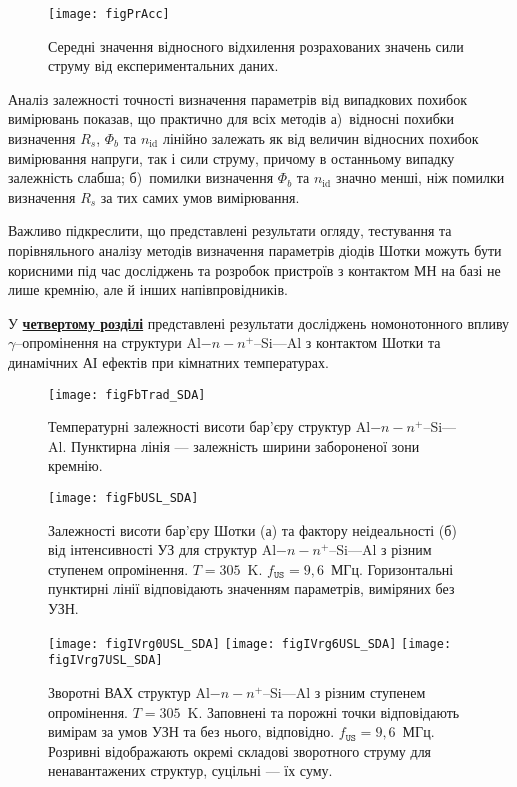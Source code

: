 \documentclass[a5paper,10pt,twoside,openany,article]{memoir} %
\begin{document}
\begin{figure}
\center
\texttt{[image: figPrAcc]}%
\caption{\label{figPrAcc}
Середні значення відносного відхилення розрахованих значень сили струму від експериментальних даних.
}
\end{figure}


Аналіз залежності точності визначення параметрів від випадкових похибок вимірювань показав, що практично для всіх методів
а)~відносні похибки визначення $R_s$, $\Phi_b$ та $n_\mathrm{id}$ лінійно залежать як від величин відносних похибок вимірювання напруги, так і сили струму, причому в останньому випадку залежність слабша;
б)~помилки визначення $\Phi_b$ та $n_\mathrm{id}$ значно менші, ніж помилки визначення $R_s$ за тих самих умов вимірювання.

Важливо підкреслити, що представлені результати огляду, тестування та порівняльного аналізу методів визначення параметрів діодів Шотки можуть бути корисними під час досліджень та розробок пристроїв з контактом МН на базі не лише кремнію, але й інших напівпровідників.


У  \underline{\textbf{четвертому розділі}} представлені результати досліджень
номонотонного впливу $\gamma$--опромінення на структури Al$-n-n^+$--Si---Al з контактом Шотки та
динамічних АІ ефектів при кімнатних температурах.


\begin{figure}
\center
\texttt{[image: figFbTrad\_SDA]}
\caption{\label{figFbTrad_SDA}
Температурні залежності висоти бар'єру структур Al$-n-n^+$--Si---Al.
Пунктирна лінія --- залежність ширини забороненої зони кремнію.
}%
\end{figure}


\begin{figure}
\center
\texttt{[image: figFbUSL\_SDA]}
\caption{\label{figFbUSL_SDA}
Залежності висоти бар'єру Шотки (а) та фактору неідеальності (б)  від інтенсивності УЗ для
структур Al$-n-n^+$--Si---Al з різним ступенем опромінення.
$T=305$~K.
$f_\mathtt{US}=9,6$~МГц.
Горизонтальні пунктирні лінії відповідають значенням параметрів, виміряних без УЗН.
}%
\end{figure}

\begin{figure}
\center
\texttt{[image: figIVrg0USL\_SDA]}\hfill
\texttt{[image: figIVrg6USL\_SDA]}\hfill
\texttt{[image: figIVrg7USL\_SDA]}
\caption{\label{figIVrg0USL_SDA}
Зворотні  ВАХ  структур Al$-n-n^+$--Si---Al з різним ступенем опромінення.
$T=305$~K.
Заповнені та порожні точки відповідають вимірам за умов УЗН та без нього, відповідно.
$f_\mathtt{US}=9,6$~МГц.
Розривні відображають окремі складові зворотного струму для ненавантажених структур,
суцільні --- їх суму.
}%
\end{figure}
\end{document}
